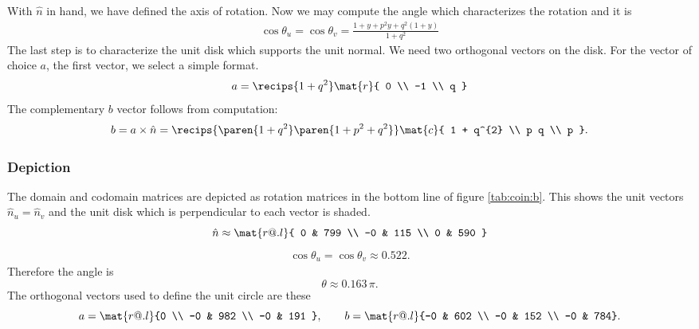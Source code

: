 %
With $\hat{n}$ in hand, we have defined the axis of rotation. Now we may compute the angle which characterizes the rotation and it is
%
\begin{equation}
  \begin{split}
    \cos \theta_{u} = 
    \cos \theta_{v} = 
    \frac{1+y+p^{2} y+q^{2} (1+y)}{1+q^{2}} 
  \end{split}
\end{equation}
%
The last step is to characterize the unit disk which supports the unit normal. We need two orthogonal vectors on the disk. For the vector of choice $a$, the first vector, we select a simple format. 
%
\begin{equation}
  a = \recips{1+q^{2}} \mat{r}{ 0 \\ -1 \\ q } \\
\end{equation}
%
The complementary $b$ vector follows from computation:
%
\begin{equation}
    b = a \times \hat{n} 
      = \recips{\paren{1 + q^{2}} \paren{1 + p^{2} + q^{2}}} \mat{c}{ 1 + q^{2} \\ p q \\ p }.
\end{equation}


\subsubsection{Depiction}
The domain and codomain matrices are depicted as rotation matrices in the bottom line of figure \eqref{tab:coin:b}. This shows the unit vectors $\hat{n}_{u} = \hat{n}_{v}$ and the unit disk which is perpendicular to each vector is shaded.
%
\begin{equation}
  \hat{n} \approx \mat{r@{.}l}{ 0 & 799 \\ -0 & 115 \\ 0 & 590 }
\end{equation}
%
\begin{equation}
  \begin{split}
    \cos \theta_{u} = 
    \cos \theta_{v} \approx 0.522. 
  \end{split}
\end{equation}
%
Therefore the angle is
\begin{equation}
  \theta \approx 0.163\, \pi.
\end{equation}
%
The orthogonal vectors used to define the unit circle are these
%
\begin{equation}
  a = \mat{r@{.}l}{0 \\ -0 & 982 \\ -0 & 191 }, \qquad  
  b = \mat{r@{.}l}{-0 & 602 \\ -0 & 152 \\ -0 & 784} .
\end{equation}


%
\endinput